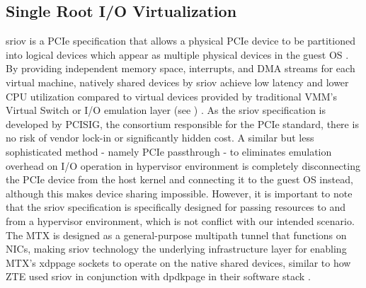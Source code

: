 \subsection{Single Root I/O Virtualization}
\ac{sriov} is a \ac{PCIe} specification that allows a physical \ac{PCIe} device to be partitioned into logical devices which appear as multiple physical devices in the guest \ac{OS} \cite{ibm_sriov}\cite{vmware_sriov}. 
By providing independent memory space, interrupts, and \ac{DMA} streams for each virtual machine, natively shared devices by \ac{sriov} achieve low latency and lower CPU utilization compared to virtual devices provided by traditional \ac{VMM}'s Virtual Switch or  I/O emulation layer (see ) \cite{intel_sriov}.
As the \ac{sriov} specification is developed by \ac{PCISIG}, the consortium responsible for the \ac{PCIe} standard, there is no risk of vendor lock-in or significantly hidden cost.
A similar but less sophisticated method - namely \ac{PCIe} passthrough - to eliminates emulation overhead on I/O operation in hypervisor environment is completely disconnecting the \ac{PCIe} device from the host kernel and connecting it to the guest \ac{OS} instead, although this makes device sharing impossible.
However, it is important to note that the \ac{sriov} specification is specifically designed for passing resources to and from a hypervisor environment, which is not conflict with our intended scenario.
The \ac{MTX} is designed as a general-purpose multipath tunnel that functions on \ac{NIC}s, making \ac{sriov} technology the underlying infrastructure layer for enabling \ac{MTX}'s \ac{xdppage} sockets to operate on the native shared devices, similar to how \ac{ZTE} used \ac{sriov} in conjunction with \ac{dpdkpage} in their software stack \cite{zte_upf_full_whitepaper}.

